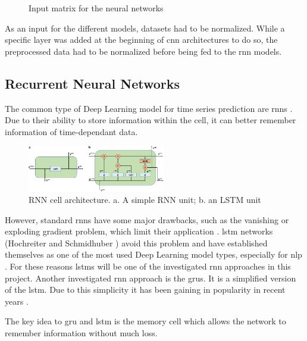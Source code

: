 \documentclass[conference]{IEEEtran}
\begin{document}
\begin{figure}[htp]
	\centering
	
	\caption{Input matrix for the neural networks}
	\label{fig:output_matrix}
\end{figure}

As an input for the different models, datasets had to be normalized. While a specific layer was added at the beginning of \gls{cnn} architectures to do so, the preprocessed data had to be normalized before being fed to the \gls{rnn} models.


\noindent
\subsection{Recurrent Neural Networks}

The common type of Deep Learning model for time series prediction are \glspl{rnn} \cite{Bai2018}. Due to their ability to store information within the cell, it can better remember information of time-dependant data. 


\begin{figure}[htp]
	\centering
	\includegraphics[width=6cm]{RNN-cell-architecture.png}
	\caption{RNN cell architecture. a. A simple RNN unit; b. an LSTM unit \cite{Chen2021}}
	\label{fig:RNN-classification}
\end{figure}

However, standard \glspl{rnn} have some major drawbacks, such as the vanishing or exploding gradient problem, which limit their application \cite{Bengio1994}. \gls{lstm} networks (Hochreiter and Schmidhuber \cite{Hochreiter1997}) avoid this problem and have established themselves as one of the most used Deep Learning model types, especially for \gls{nlp} \cite{Wu2016}. For these reasons \glspl{lstm} will be one of the investigated \gls{rnn} approaches in this project. Another investigated \gls{rnn} approach is the \glspl{gru}. It is a simplified version of the \gls{lstm}. Due to this simplicity it has been gaining in popularity in recent years \cite{Rana2016}. 

The key idea to \gls{gru} and \gls{lstm} is the memory cell which allows the network to remember information without much loss.
\end{document}
